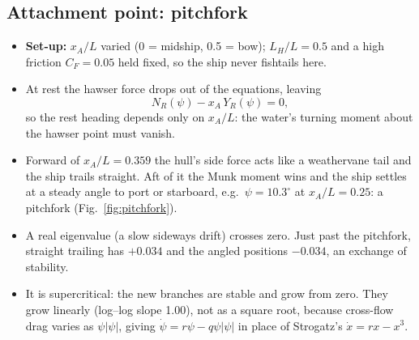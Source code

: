 \documentclass[11pt,a4paper]{article}
\begin{document}
\subsection{Attachment point: pitchfork}
\begin{itemize}
\item \textbf{Set-up:} $x_A/L$ varied (0 = midship, 0.5 = bow); $L_H/L=0.5$ and a high friction $C_F=0.05$ held
fixed, so the ship never fishtails here.
\item At rest the hawser force drops out of the equations, leaving
\[
N_R(\psi)-x_A\,Y_R(\psi)=0,
\]
so the rest heading depends only on $x_A/L$: the water's turning moment about the hawser point must vanish.
\item Forward of $x_A/L=0.359$ the hull's side force acts like a weathervane tail and the ship trails straight. Aft of
it the Munk moment wins and the ship settles at a steady angle to port or starboard, e.g.\ $\psi=10.3^\circ$ at
$x_A/L=0.25$: a pitchfork (Fig.~\ref{fig:pitchfork}).
\item A real eigenvalue (a slow sideways drift) crosses zero. Just past the pitchfork, straight trailing has $+0.034$ and
the angled positions $-0.034$, an exchange of stability.
\item It is supercritical: the new branches are stable and grow from zero. They grow linearly (log--log slope 1.00), not
as a square root, because cross-flow drag varies as $\psi|\psi|$, giving $\dot\psi=r\psi-q\psi|\psi|$ in place of
Strogatz's $\dot x=rx-x^3$.
\end{itemize}
\end{document}
